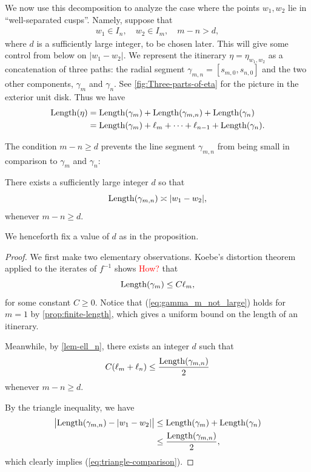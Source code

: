 We now use this decomposition to analyze the case where the points $w_1,w_2$ lie in ``well-separated cusps''. Namely, suppose that
\begin{align} \label{parabolic separation}
	w_1 \in I_n, \quad w_2 \in I_m, \quad m-n > d,
\end{align}
where $d$ is a sufficiently large integer, to be chosen later. 
This will give some control from below on $|w_1-w_2|$. 
We represent the itinerary $\eta=\eta_{w_1,w_2}$ as a concatenation of three paths: the radial segment $\gamma_{m,n}=[s_{m,0},s_{n,0}]$ and the two other components, $\gamma _m$ and $\gamma_n$. See \cref{fig:Three-parts-of-eta} for the picture in the exterior unit disk.
Thus we have
\begin{equation}
\begin{split}    
\operatorname{Length}(\eta) &=\operatorname{Length}(\gamma_m)+\operatorname{Length}(\gamma_{m,n})+\operatorname{Length}(\gamma_n) \\ 
&= \operatorname{Length}(\gamma_m)+\ell_m + \dots +\ell_{n-1}+\operatorname{Length}(\gamma_n).
\end{split}
\end{equation}



The condition $m-n \geq d$ prevents the line segment $\gamma _{m,n}$ from being small in comparison to $\gamma_m$ and $\gamma_n$:
\begin{proposition}
\label {case-3-proof}
There exists a sufficiently large integer $d$ so that 
	\begin{equation}
	\label{eq:triangle-comparison}
		\operatorname{Length}(\gamma_{m,n}) \asymp |w_1-w_2|,
	\end{equation}
	whenever $m-n \geq d$.
\end{proposition}

We henceforth fix a value of $d$ as in the proposition.
\begin{proof} 
We first make two elementary observations. Koebe's distortion theorem applied to the iterates of $f^{-1}$ shows \textcolor{red}{How?} that
\begin{equation} \label{eq:gamma_m_not_large}
		\operatorname{Length}(\gamma_m) \leq C \ell_m,
	\end{equation}
for some constant $C \geq 0$. Notice that (\ref{eq:gamma_m_not_large}) holds for $m=1$ by \cref{prop:finite-length}, which gives a uniform bound on the length of an itinerary.

Meanwhile, by \cref{lem-ell_n}, there exists an integer $d$ such that
\begin{align}
C(\ell_m + \ell _n) \leq \frac{\operatorname{Length}(\gamma_{m,n})}{2}
\end{align}
whenever $m-n \geq d$.

By the triangle inequality, we have
\begin{align*} 
		\bigl | \operatorname{Length}(\gamma_{m,n}) - |w_1-w_2| \bigr | & \le \operatorname{Length}(\gamma_m)+\operatorname{Length}(\gamma_n) \\
		& \le \frac{\operatorname{Length}(\gamma_{m,n})}{2},
\end{align*}
which clearly implies (\ref{eq:triangle-comparison}).
\end{proof}


